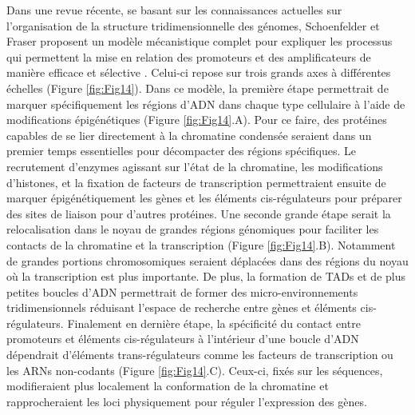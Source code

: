 Dans une revue récente, se basant sur les connaissances actuelles sur l’organisation de la structure tridimensionnelle des génomes, Schoenfelder et Fraser proposent un modèle mécanistique complet pour expliquer les processus qui permettent la mise en relation des promoteurs et des \glspl{amplificateur} de manière efficace et sélective \citep{schoenfelder_long-range_2019}. Celui-ci repose sur trois grands axes à différentes échelles (Figure \ref{fig:Fig14}). Dans ce modèle, la première étape permettrait de marquer spécifiquement les régions d’ADN dans chaque type cellulaire à l’aide de modifications épigénétiques (Figure \ref{fig:Fig14}.A). Pour ce faire, des protéines capables de se lier directement à la chromatine condensée seraient dans un premier temps essentielles pour décompacter des régions spécifiques. Le recrutement d’enzymes agissant sur l’état de la chromatine, les modifications d'histones, et la fixation de facteurs de transcription permettraient ensuite de marquer épigénétiquement les gènes et les éléments \gls{cis}-régulateurs pour préparer des sites de liaison pour d’autres protéines. Une seconde grande étape serait la relocalisation dans le noyau de grandes régions génomiques pour faciliter les contacts de la chromatine et la transcription (Figure \ref{fig:Fig14}.B). Notamment de grandes portions chromosomiques seraient déplacées dans des régions du noyau où la transcription est plus importante. De plus, la formation de \acrshort{TAD}s et de plus petites boucles d’ADN permettrait de former des micro-environnements tridimensionnels réduisant l’espace de recherche entre gènes et éléments \gls{cis}-régulateurs. Finalement en dernière étape, la spécificité du contact entre promoteurs et éléments \gls{cis}-régulateurs à l’intérieur d’une boucle d’ADN dépendrait d’éléments \gls{trans}-régulateurs comme les facteurs de transcription ou les \acrshort{ARN}s non-codants (Figure \ref{fig:Fig14}.C). Ceux-ci, fixés sur les séquences, modifieraient plus localement la conformation de la chromatine et rapprocheraient les loci physiquement pour réguler l’expression des gènes.


